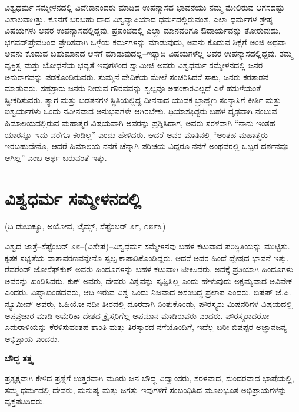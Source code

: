 ವಿಶ್ವಧರ್ಮ ಸಮ್ಮೇಳನದಲ್ಲಿ ವಿವೇಕಾನಂದರು ಮಾಡಿದ ಉಪನ್ಯಾಸದ ಭಾವನೆಯು ನಮ್ಮ ಮೇಲಿರುವ ಆಗಸದಷ್ಟು ವಿಶಾಲವಾಗಿತ್ತು. ಕೊನೆಗೆ ಬರಬಹು ದಾದ ವಿಶ್ವವ್ಯಾಪಿಯಾದ ಧರ್ಮದಲ್ಲಿರುವಂತೆ, ಎಲ್ಲಾ ಧರ್ಮಗಳ ಶ್ರೇಷ್ಠ ವಿಷಯಗಳು ಅವರ ಉಪನ್ಯಾಸದಲ್ಲಿದ್ದವು. ಪ್ರಪಂಚದಲ್ಲಿ ಎಲ್ಲಾ ಮಾನವರಿಗೂ ಔದಾರ್ಯವನ್ನು ತೋರುವುದು, ಭಗವದ್​ ಪ್ರೇವದಿಂದ ಪ್ರೇರಿತವಾಗಿ ಒಳ್ಳೆಯ ಕರ್ಮಗಳನ್ನು ಮಾಡುವುದು, ಅವನು ಕೊಡುವ ಶಿಕ್ಷೆಗೆ ಅಂಜಿ ಅಥವಾ ಅವನು ಕೊಡುವ ಬಹುಮಾನದ ಆಸೆಗೆ ಮಾಡುವುದಲ್ಲ–ಇತ್ಯಾದಿ ವಿಷಯಗಳೆಲ್ಲ ಅವರ ಉಪನ್ಯಾಸದಲ್ಲಿದ್ದವು. ತಮ್ಮ ವ್ಯಕ್ತಿತ್ವ ಮತ್ತು ಬೋಧನೆಯ ಭವ್ಯತೆ ಇವುಗಳಿಂದ ಸ್ವಾಮೀಜಿ ಅವರು ವಿಶ್ವಧರ್ಮ ಸಮ್ಮೇಳನದಲ್ಲಿ ಜನರ ಅನುರಾಗವನ್ನು ಪಡಕೊಂಡಿರುವರು. ಸುಮ್ಮನೆ ವೇದಿಕೆಯ ಮೇಲೆ ಸಂಚರಿಸಿದರೆ ಸಾಕು, ಜನರು ಕರತಾಡನ ಮಾಡುವರು. ಸಹಸ್ರಾರು ಜನರು ನೀಡುವ ಗೌರವವನ್ನು ಸ್ವಲ್ಪವೂ ಅಹಂಕಾರವಿಲ್ಲದೆ ಎಳೆ ಹಸುಳೆಯಂತೆ ಸ್ವೀಕರಿಸುವರು. ತ್ಯಾಗ ಮತ್ತು ಬಡತನಗಳ ಸ್ಥಿತಿಯಲ್ಲಿದ್ದ ದೀನನಾದ ಯುವಕ ಬ್ರಾಹ್ಮಣ ಸಂನ್ಯಾಸಿಗೆ ಕೀರ್ತಿ ಮತ್ತು ಐಶ್ವರ್ಯಗಳು ಒಂದು ನವೀನವಾದ ಅನುಭವಗಳೇ ಆಗಿರಬೇಕು. ಥಿಯಾಸಫಿಸ್ಟರು ಬಹಳ ದೃಢವಾಗಿ ನಂಬುವ ಹಿಮಾಲಯದಲ್ಲಿರುವ ಮಹಾತ್ಮರ ವಿಷಯವಾಗಿ ಅವರನ್ನು ಪ್ರಶ್ನಿಸಿದಾಗ, ಅವರು ಸರಳವಾಗಿ “ನಾನು ಇಂತಹ ಯಾರನ್ನೂ ಇದು ವರೆಗೂ ಕಂಡಿಲ್ಲ” ಎಂದು ಹೇಳಿದರು. ಆದರೆ ಅವರ ಮಾತಿನಲ್ಲಿ “ಅಂತಹ ಮಹಾತ್ಮರು ಇರಬಹುದೇನೊ, ಆದರೆ ಹಿಮಾಲಯ ನನಗೆ ಚೆನ್ನಾಗಿ ಪರಿಚಯ ವಿದ್ದರೂ ನನಗೆ ಅಂಥವರಲ್ಲಿ ಒಬ್ಬರ ದರ್ಶನವೂ ಆಗಿಲ್ಲ” ಎಂಬ ಅರ್ಥ ಬರುವಂತೆ ಇತ್ತು.


\section{ವಿಶ್ವಧರ್ಮ ಸಮ್ಮೇಳನದಲ್ಲಿ}

\begin{center}
(ದಿ ಡುಬುಕ್ಯೂ, ಅಯೋವ, ಟೈಮ್ಸ್​, ಸೆಪ್ಟೆಂಬರ್​ ೨೯, ೧೮೯೩)
\end{center}

ವಿಶ್ವದ ಜಾತ್ರೆ–ಸೆಪ್ಟೆಂಬರ್​ ೨೮–(ವಿಶೇಷ)–ವಿಶ್ವಧರ್ಮ ಸಮ್ಮೇಳನವು ಬಹಳ ಕಟುವಾದ ಪರಿಸ್ಥಿತಿಯನ್ನು ಮುಟ್ಟಿತು. ಕೃತಕ ಸಭ್ಯತೆಯ ವಾತಾವರಣವನ್ನೇನೊ ಸ್ವಲ್ಪ ಕಾಪಾಡಿಕೊಂಡಿದ್ದರು. ಆದರೆ ಅದರ ಹಿಂದೆ ದ್ವೇಷದ ಭಾವನೆ ಇತ್ತು. ರೆವರೆಂಡ್​ ಜೋಸೆಫ್​ಕುಕ್​ ಅವರು ಹಿಂದೂಗಳನ್ನು ಬಹಳ ಕಟುವಾಗಿ ಟೀಕಿಸಿದರು. ಅದಕ್ಕೆ ಪ್ರತಿಯಾಗಿ ಹಿಂದೂಗಳು ಅವರನ್ನು ಖಂಡಿಸಿದರು. ಕುಕ್​ ಅವರು, ದೇವರು ವಿಶ್ವವನ್ನು ಸೃಷ್ಟಿಸಿಲ್ಲ ಎಂದು ಹೇಳುವುದು ಅಕ್ಷಮ್ಯವಾದ ಅವಿವೇಕ ಎಂದರು. ಏಷ್ಯಾಖಂಡದವರು, ಆದಿ ಇರುವ ವಿಶ್ವ ಒಂದು ನಿಜವಾದ ಅಸಂಬದ್ಧ ಪ್ರಲಾಪ ಎಂದರು. ಬಿಷಪ್​ ಜೆ.ಪಿ. ನ್ಯೂಮೀನ್​ ಅವರು, ಓಹಿಯೋ ನದೀ ತೀರದಲ್ಲಿ ದೂರವಾಗಿ ನಿಂತುಕೊಂಡು, ಪೌರಸ್ತ್ಯರು ಮಿಷನರಿಗಳ ವಿಷಯದಲ್ಲಿ ಅಪಪ್ರಚಾರ ಮಾಡಿ ಅಮೆರಿಕಾ ದೇಶದ ಕ್ರೈಸ್ತರಿಗೆಲ್ಲ ಅಪಮಾನ ಮಾಡಿರುವರು ಎಂದರು. ಪೌರಸ್ತ್ಯರಾದರೋ ಎದುರಾಳಿಯನ್ನು ಕೆರಳಿಸುವಂತಹ ಶಾಂತಿ ಮತ್ತು ತಿರಸ್ಕಾರದ ನಗೆಯೊಂದಿಗೆ, ಇದೆಲ್ಲ ಬರೀ ಬಿಷಪ್ಪರ ಅಜ್ಞಾನಜನ್ಯ ಅಭಿಪ್ರಾಯ ಎಂದರು.

\begin{center}
\textbf{ಬೌದ್ಧ ತತ್ತ್ವ}
\end{center}

ಪ್ರತ್ಯಕ್ಷವಾಗಿ ಕೇಳಿದ ಪ್ರಶ್ನೆಗೆ ಉತ್ತರವಾಗಿ ಮೂರು ಜನ ಬೌದ್ಧ ವಿದ್ವಾಂಸರು, ಸರಳವಾದ, ಸುಂದರವಾದ ಭಾಷೆಯಲ್ಲಿ, ತಮ್ಮ ಧರ್ಮದಲ್ಲಿ ದೇವರು, ಮನುಷ್ಯ ಮತ್ತು ಜಗತ್ತು ಇವುಗಳಿಗೆ ಸಂಬಂಧಿಸಿದ ಮೂಲಭೂತ ಅಭಿಪ್ರಾಯಗಳನ್ನು ವ್ಯಕ್ತಪಡಿಸಿದರು.

